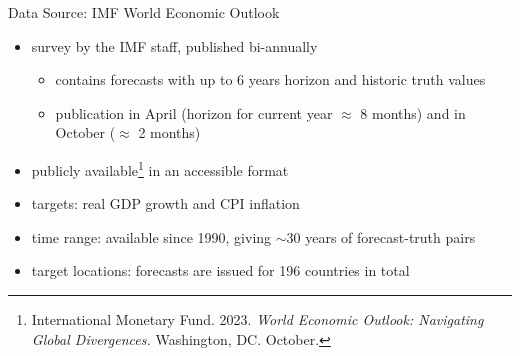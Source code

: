\documentclass[en]{sdqbeamer}
\begin{document}
   
\begin{frame}{Data Source: IMF World Economic Outlook}
	\begin{itemize}
		\item survey by the IMF staff, published bi-annually
		\begin{itemize}
            \item contains forecasts with up to 6 years horizon and historic truth values
		    \item publication in April (horizon for current year $\approx$ 8 months) and in October ($\approx$ 2 months)
		\end{itemize}
    \item publicly available\footnote{International Monetary Fund. 2023. \textit{World Economic Outlook: Navigating Global Divergences.} Washington, DC. October.} in an accessible format
    \item targets: real GDP growth and CPI inflation 
    \item time range: available since 1990, giving $\sim$30 years of forecast-truth pairs %
    \item target locations: forecasts are issued for 196 countries in total
	\end{itemize}
\end{frame}
\end{document}
